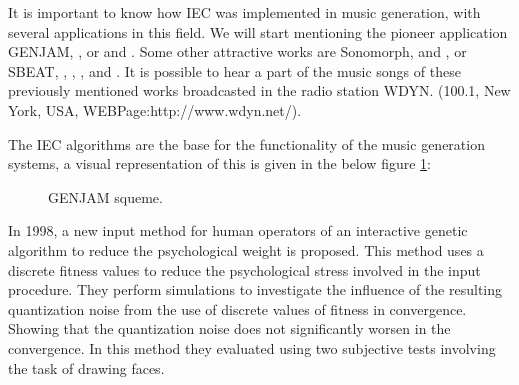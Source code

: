It is important to know how IEC was implemented in music generation, with
several applications in this field. We will start mentioning the pioneer
application GENJAM, \cite{biles1994genjam},
\cite{biles1996neural} or \cite{biles1999life} and
\cite{biles2002genjam}. Some other attractive works are Sonomorph,
\cite{nelson1993sonomorphs} and \cite{nelson1995further}, or SBEAT, \cite{unemi2003sbeat3},
\cite{horowitz1994generating}, \cite{onisawa2000composition}, \cite{tokui2000music} and
\cite{fels2002interactive}. It is possible to hear a part of the
music songs of these previously mentioned works broadcasted in the radio station
WDYN. (100.1, New York, USA, WEBPage:http://www.wdyn.net/).

The IEC algorithms are the base for the functionality of the music generation
systems, a visual representation of this is given in the below figure \ref{fig:GENJAM}:

\begin{figure}
\captionsetup{justification=centering,margin=2cm}
\centering
\setlength\fboxsep{0pt}
\setlength\fboxrule{0.7pt}
\caption{GENJAM squeme.}
\label{fig:GENJAM}
\end{figure}

In 1998, a new input method for human operators of an interactive genetic algorithm 
to reduce the psychological weight is proposed. This method uses a
discrete fitness values to reduce the psychological stress involved in the input
procedure. They perform simulations to investigate the influence of the
resulting quantization noise from the use of discrete values of fitness in
convergence. Showing that the quantization noise does not significantly worsen
in the convergence. In this method they evaluated using two subjective tests
involving the task of drawing faces.

